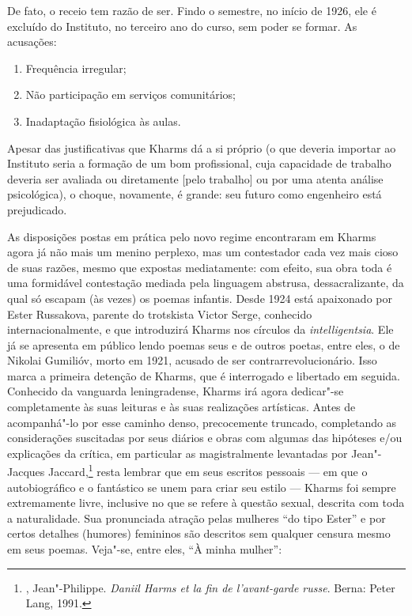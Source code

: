 De fato, o receio tem razão de ser. Findo o semestre, no início
de 1926, ele é excluído do Instituto, no terceiro ano do curso,
sem poder se formar. As acusações:

\pagebreak

\begin{enumerate}
\item{}Frequência irregular;
\item{}Não participação em serviços comunitários;
\item{}Inadaptação fisiológica às aulas.
\end{enumerate}

Apesar das justificativas que Kharms dá a si próprio (o que
deveria importar ao Instituto seria a formação de um bom
profissional, cuja capacidade de trabalho deveria ser avaliada
ou diretamente [pelo trabalho] ou por uma atenta análise
psicológica), o choque, novamente, é grande: seu futuro como
engenheiro está prejudicado.

As disposições postas em prática pelo novo regime encontraram em
Kharms agora já não mais um menino perplexo, mas um contestador
cada vez mais cioso de suas razões, mesmo que expostas mediatamente:
com efeito, sua obra toda é uma formidável contestação mediada pela
linguagem abstrusa, dessacralizante, da qual só escapam (às vezes)
os poemas infantis. Desde 1924 está apaixonado por Ester Russakova,
parente do trotskista Victor Serge, conhecido internacionalmente,
e que introduzirá Kharms nos círculos da \emph{intelligentsia}.
Ele já se apresenta em público lendo poemas seus e de outros
poetas, entre eles, o de Nikolai Gumilióv, morto em 1921, acusado
de ser contrarrevolucionário. Isso marca a primeira detenção de
Kharms, que é interrogado e libertado em seguida. Conhecido da
vanguarda leningradense, Kharms irá agora dedicar"-se completamente
às suas leituras e às suas realizações artísticas. Antes de
acompanhá"-lo por esse caminho denso, precocemente
truncado, completando as considerações suscitadas por seus
diários e obras com algumas das hipóteses e/ou explicações
da crítica, em particular as magistralmente levantadas por
Jean"-Jacques Jaccard,\footnote{, Jean"-Philippe.
\emph{Daniil Harms et la fin de l'avant-garde russe}. Berna: Peter
Lang, 1991.} resta lembrar que em seus escritos pessoais ---
em que o autobiográfico e o fantástico se unem para criar seu
estilo --- Kharms foi sempre extremamente livre, inclusive no
que se refere à questão sexual, descrita com toda a naturalidade.
Sua pronunciada atração pelas mulheres ``do tipo Ester'' e por certos detalhes (humores) femininos são descritos
sem qualquer censura mesmo em seus poemas. Veja"-se, entre eles,
``À minha mulher'':

